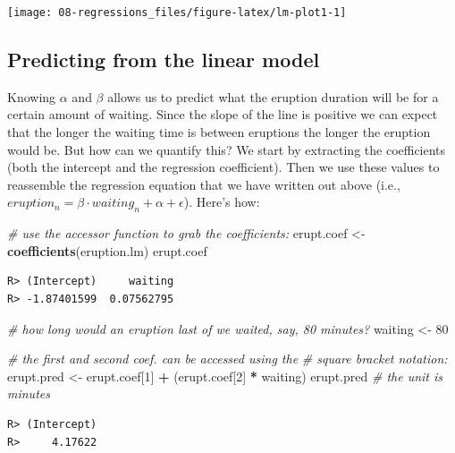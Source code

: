 \documentclass[english,10pt,a4paper,oneside]{book}
\newenvironment{Shaded}{\begin{snugshade}}{\end{snugshade}}
\newcommand{\CommentTok}[1]{\textcolor[rgb]{0.56,0.35,0.01}{\textit{#1}}}
\newcommand{\DecValTok}[1]{\textcolor[rgb]{0.00,0.00,0.81}{#1}}
\newcommand{\KeywordTok}[1]{\textcolor[rgb]{0.13,0.29,0.53}{\textbf{#1}}}
\newcommand{\NormalTok}[1]{#1}
\newcommand{\OperatorTok}[1]{\textcolor[rgb]{0.81,0.36,0.00}{\textbf{#1}}}
\newcommand{\StringTok}[1]{\textcolor[rgb]{0.31,0.60,0.02}{#1}}
\theoremstyle{definition}
\theoremstyle{definition}
\theoremstyle{definition}
\theoremstyle{remark}
\begin{document}
\texttt{[image: 08-regressions\_files/figure-latex/lm-plot1-1]}

\hypertarget{predicting-from-the-linear-model}{%
\subsection{Predicting from the linear
model}\label{predicting-from-the-linear-model}}

Knowing \(\alpha\) and \(\beta\) allows us to predict what the eruption
duration will be for a certain amount of waiting. Since the slope of the
line is positive we can expect that the longer the waiting time is
between eruptions the longer the eruption would be. But how can we
quantify this? We start by extracting the coefficients (both the
intercept and the regression coefficient). Then we use these values to
reassemble the regression equation that we have written out above (i.e.,
\(eruption_{n}=\beta \cdot waiting_{n}+\alpha+\epsilon\)). Here's how:

\begin{Shaded}
\begin{Highlighting}[]
\CommentTok{# use the accessor function to grab the coefficients:}
\NormalTok{erupt.coef <-}\StringTok{ }\KeywordTok{coefficients}\NormalTok{(eruption.lm)}
\NormalTok{erupt.coef}
\end{Highlighting}
\end{Shaded}

\begin{verbatim}
R> (Intercept)     waiting 
R> -1.87401599  0.07562795
\end{verbatim}

\begin{Shaded}
\begin{Highlighting}[]
\CommentTok{# how long would an eruption last of we waited, say, 80 minutes?}
\NormalTok{waiting <-}\StringTok{ }\DecValTok{80} 
 
\CommentTok{# the first and second coef. can be accessed using the }
\CommentTok{# square bracket notation:}
\NormalTok{erupt.pred <-}\StringTok{ }\NormalTok{erupt.coef[}\DecValTok{1}\NormalTok{] }\OperatorTok{+}\StringTok{ }\NormalTok{(erupt.coef[}\DecValTok{2}\NormalTok{] }\OperatorTok{*}\StringTok{ }\NormalTok{waiting)}
\NormalTok{erupt.pred }\CommentTok{# the unit is minutes}
\end{Highlighting}
\end{Shaded}

\begin{verbatim}
R> (Intercept) 
R>     4.17622
\end{verbatim}
\end{document}
